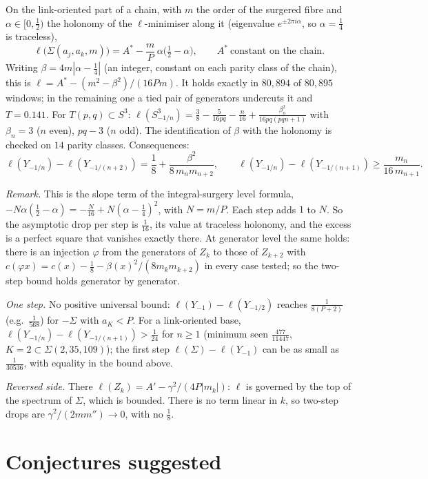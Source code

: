 \documentclass[10pt]{amsart}
\newcommand{\st}[1]{\par\noindent\textit{#1}\enspace}
\begin{document}
On the link-oriented part of a chain, with $m$ the order of the surgered fibre
and $\alpha\in[0,\frac12)$ the holonomy of the $\ell$-minimiser along it
(eigenvalue $e^{\pm2\pi i\alpha}$, so $\alpha=\frac14$ is traceless),
\[
\ell\bigl(\Sigma(a_j,a_k,m)\bigr)=A^*-\frac mP\,\alpha\bigl(\tfrac12-\alpha\bigr),
\qquad A^*\ \text{constant on the chain}.
\]
Writing $\beta=4m|\alpha-\frac14|$ (an integer, constant on each parity class
of the chain), this is $\ell=A^*-(m^2-\beta^2)/(16Pm)$. It holds exactly in
$80{,}894$ of $80{,}895$ windows; in the remaining one a tied pair of generators
undercuts it and $T=0.141$. For $T(p,q)\subset S^3$:
$\ell(S^3_{-1/n})=\frac38-\frac5{16pq}-\frac n{16}+\frac{\beta_n^2}{16pq(pqn+1)}$
with $\beta_n=3$ ($n$ even), $pq-3$ ($n$ odd). The identification of $\beta$
with the holonomy is checked on $14$ parity classes. Consequences:
\[
\ell(Y_{-1/n})-\ell(Y_{-1/(n+2)})=\frac18+\frac{\beta^2}{8\,m_nm_{n+2}},\qquad
\ell(Y_{-1/n})-\ell(Y_{-1/(n+1)})\ge\frac{m_n}{16\,m_{n+1}}.
\]

\st{Remark.} This is the slope term of the integral-surgery level formula,
$-N\alpha(\frac12-\alpha)=-\frac N{16}+N(\alpha-\frac14)^2$, with $N=m/P$. Each
step adds $1$ to $N$. So the asymptotic drop per step is $\frac1{16}$, its value
at traceless holonomy, and the excess is a perfect square that vanishes exactly
there. At generator level the same holds: there is an injection
$\varphi$ from the generators of $Z_k$ to those of $Z_{k+2}$ with
$c(\varphi x)=c(x)-\frac18-\beta(x)^2/(8m_km_{k+2})$ in every case tested; so the
two-step bound holds generator by generator.

\st{One step.} No positive universal bound: $\ell(Y_{-1})-\ell(Y_{-1/2})$ reaches
$\frac1{8(P+2)}$ (e.g.\ $\frac1{568}$) for $-\Sigma$ with $a_K<P$. For a
link-oriented base, $\ell(Y_{-1/n})-\ell(Y_{-1/(n+1)})>\frac1{24}$ for $n\ge1$ (minimum seen
$\frac{477}{11447}$, $K=2\subset\Sigma(2,35,109)$); the first step $\ell(\Sigma)-\ell(Y_{-1})$ can be
as small as $\frac1{30536}$, with equality in the bound above.

\st{Reversed side.} There $\ell(Z_k)=A'-\gamma^2/(4P|m_k|)$: $\ell$ is governed
by the top of the spectrum of $\Sigma$, which is bounded. There is no term
linear in $k$, so two-step drops are $\gamma^2/(2mm'')\to0$, with no
$\frac18$.

\section{Conjectures suggested}
\end{document}

